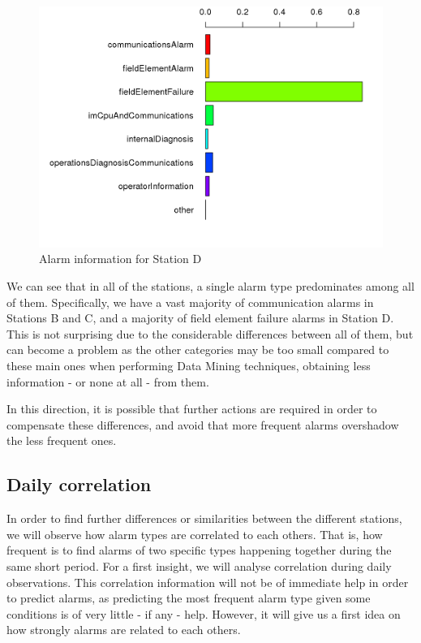\begin{figure}[htb]
 \centering
 \includegraphics[width=\textwidth]{./img/sevilla_graph.png}
 \caption{Alarm information for Station D}
 \label{fig:sevilla_chart}
\end{figure}

\clearpage

We can see that in all of the stations, a single alarm type predominates among all of them. Specifically, we have a vast majority of communication alarms in Stations B and C, and a majority of field element failure alarms in Station D. This is not surprising due to the considerable differences between all of them, but can become a problem as the other categories may be too small compared to these main ones when performing Data Mining techniques, obtaining less information - or none at all - from them.

In this direction, it is possible that further actions are required in order to compensate these differences, and avoid that more frequent alarms overshadow the less frequent ones.

\subsection{Daily correlation}
In order to find further differences or similarities between the different stations, we will observe how alarm types are correlated to each others\cite{edwards1976introduction}. That is, how frequent is to find alarms of two specific types happening together during the same short period. For a first insight, we will analyse correlation during daily observations. This correlation information will not be of immediate help in order to predict alarms, as predicting the most frequent alarm type given some conditions is of very little - if any - help. However, it will give us a first idea on how strongly alarms are related to each others.

